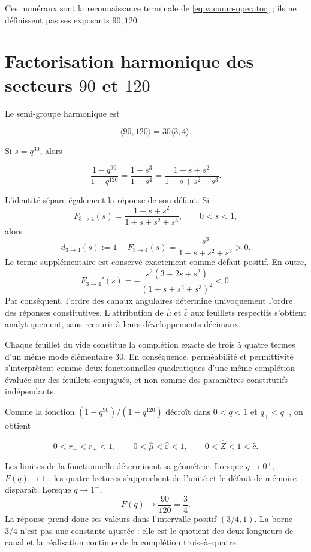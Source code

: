 Ces numéraux sont la reconnaissance terminale de \cref{eq:vacuum-operator} ; ils ne définissent pas ses exposants \(90,120\).

\section{Factorisation harmonique des secteurs \(90\) et \(120\)}

Le semi-groupe harmonique est

\[
\langle90,120\rangle=30\langle3,4\rangle.
\]

Si \(s=q^{30}\), alors

\begin{equation}
\frac{1-q^{90}}{1-q^{120}}
=\frac{1-s^3}{1-s^4}
=\frac{1+s+s^2}{1+s+s^2+s^3}.
\label{eq:three-four-completion}
\end{equation}

L'identité sépare également la réponse de son défaut. Si
\[
F_{3\to4}(s)=\frac{1+s+s^2}{1+s+s^2+s^3},
\qquad 0<s<1,
\]
alors
\begin{equation}
d_{3\to4}(s):=1-F_{3\to4}(s)
=\frac{s^3}{1+s+s^2+s^3}>0.
\label{eq:vacuum-defect34}
\end{equation}
Le terme supplémentaire est conservé exactement comme défaut
positif. En outre,
\begin{equation}
F_{3\to4}'(s)
=-\frac{s^2(3+2s+s^2)}{(1+s+s^2+s^3)^2}<0.
\label{eq:vacuum-monotonic34}
\end{equation}
Par conséquent, l'ordre des canaux angulaires détermine univoquement
l'ordre des réponses constitutives. L'attribution de
\(\widehat\mu\) et \(\widehat\varepsilon\) aux feuillets respectifs s'obtient
analytiquement, sans recourir à leurs développements décimaux.

Chaque feuillet du vide constitue la complétion exacte de trois à quatre
termes d'un même mode élémentaire \(30\). En conséquence, perméabilité
et permittivité s'interprètent comme deux fonctionnelles quadratiques d'une même
complétion évaluée sur des feuillets conjugués, et non comme des paramètres
constitutifs indépendants.

Comme la fonction \((1-q^{90})/(1-q^{120})\) décroît dans \(0<q<1\) et \(q_+<q_-\), on obtient

\[
0<r_-<r_+<1,\qquad
0<\widehat\mu<\widehat\varepsilon<1,\qquad
0<\widehat Z<1<\widehat c.
\]

Les limites de la fonctionnelle déterminent sa géométrie. Lorsque \(q\to0^+\),
\(F(q)\to1\) : les quatre lectures s'approchent de l'unité et le défaut de
mémoire disparaît. Lorsque \(q\to1^-\),
\[
F(q)\longrightarrow\frac{90}{120}=\frac34.
\]
La réponse prend donc ses valeurs dans l'intervalle positif \((3/4,1)\). La
borne \(3/4\) n'est pas une constante ajustée : elle est le quotient des deux
longueurs de canal et la réalisation continue de la complétion
trois--à--quatre.


